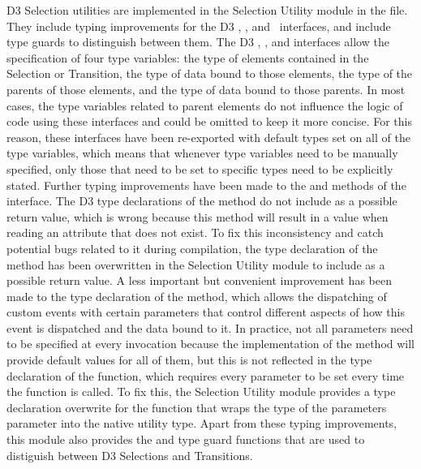 D3 Selection utilities are implemented in the Selection Utility module
in the  file. They include typing
improvements for the D3 , , and
\ interfaces, and include type guards to
distinguish between them. The D3 , ,
and  interfaces allow the specification of
four type variables: the type of elements contained in the Selection
or Transition, the type of data bound to those elements, the type of
the parents of those elements, and the type of data bound to those
parents. In most cases, the type variables related to parent elements
do not influence the logic of code using these interfaces and could be
omitted to keep it more concise. For this reason, these interfaces
have been re-exported with default types set on all of the type
variables, which means that whenever type variables need to be
manually specified, only those that need to be set to specific types
need to be explicitly stated. Further typing improvements have been
made to the  and  methods of the
 interface. The D3 type declarations of the
 method do not include  as a possible
return value, which is wrong because this method will result in a
 value when reading an attribute that does not exist. To
fix this inconsistency and catch potential bugs related to it during
compilation, the type declaration of the  method
has been overwritten in the Selection Utility module to include
 as a possible return value. A less important but
convenient improvement has been made to the type declaration of the
 method, which allows the dispatching of
custom events with certain parameters that control different aspects
of how this event is dispatched and the data bound to it. In practice,
not all parameters need to be specified at every invocation because
the implementation of the  method will
provide default values for all of them, but this is not reflected in
the type declaration of the function, which requires every parameter
to be set every time the function is called. To fix this, the
Selection Utility module provides a type declaration overwrite for the
 function that wraps the type of the
parameters parameter into the native  utility
type. Apart from these typing improvements, this module also provides
the  and  type guard functions
that are used to distiguish between D3 Selections and Transitions.


